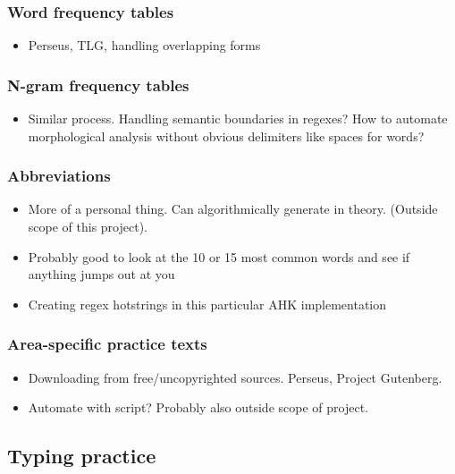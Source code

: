 \documentclass[11pt]{article}
\begin{document}
\subsubsection{Word frequency tables}
\label{sec:org67d96a3}

\begin{itemize}
\item Perseus, TLG, handling overlapping forms
\end{itemize}

\subsubsection{N-gram frequency tables}
\label{sec:orgdb37d50}

\begin{itemize}
\item Similar process. Handling semantic boundaries in regexes? How to automate morphological analysis without obvious delimiters like spaces for words?
\end{itemize}

\subsubsection{Abbreviations}
\label{sec:org4f793e8}

\begin{itemize}
\item More of a personal thing. Can algorithmically generate in theory. (Outside scope of this project).
\item Probably good to look at the 10 or 15 most common words and see if anything jumps out at you
\item Creating regex hotstrings in this particular AHK implementation
\end{itemize}

\subsubsection{Area-specific practice texts}
\label{sec:org39df615}

\begin{itemize}
\item Downloading from free/uncopyrighted sources. Perseus, Project Gutenberg.
\item Automate with script? Probably also outside scope of project.
\end{itemize}

\subsection{Typing practice}
\label{sec:org79b91bf}
\end{document}
